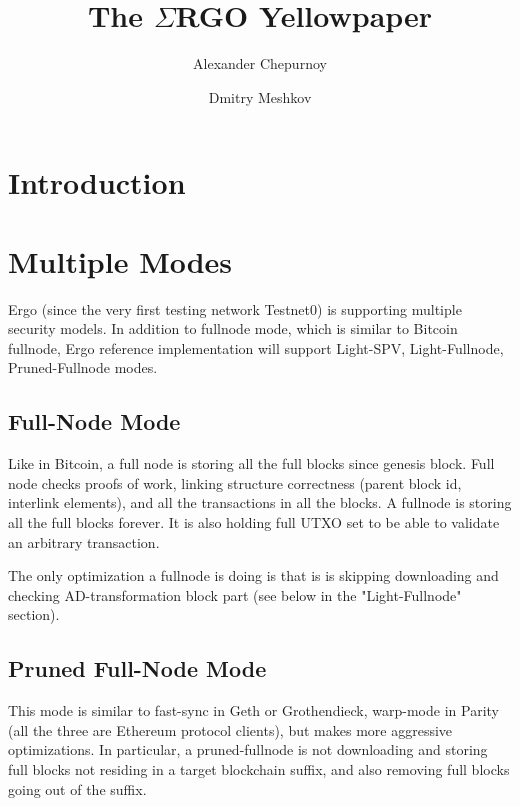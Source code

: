 \documentclass[]{report}   %
\newcommand{\ergo}{$\Sigma$RGO}
\begin{document}
\title{The \ergo{} Yellowpaper}
\author{Alexander Chepurnoy \and Dmitry Meshkov}
\maketitle

\section{Introduction}

\section{Multiple Modes}
\label{sec:modes}

Ergo (since the very first testing network Testnet0) is supporting  
multiple security models. In addition to fullnode mode, which is
similar to Bitcoin fullnode, Ergo reference implementation will 
support Light-SPV, Light-Fullnode, Pruned-Fullnode modes.
  

\subsection{Full-Node Mode}  
\label{sec:fullnode}

  
Like in Bitcoin, a full node is storing all the full blocks since 
genesis block. Full node checks proofs of work, linking structure 
correctness (parent block id, interlink elements), and all the 
transactions in all the blocks. A fullnode is storing all the full 
blocks forever. It is also holding full UTXO set to be able to validate an 
arbitrary transaction. 

The only optimization a fullnode is doing is that is is skipping downloading and checking 
AD-transformation block part (see below in the "Light-Fullnode" section).

   
\subsection{Pruned Full-Node Mode}
\label{sec:pruned}

   
This mode is similar to fast-sync in Geth or Grothendieck, warp-mode 
in Parity (all the three are Ethereum protocol clients), but makes
 more aggressive optimizations. In particular, a pruned-fullnode is 
 not downloading and storing full blocks not residing in a target 
 blockchain suffix, and also removing full blocks going out of the suffix.
 
\end{document}
